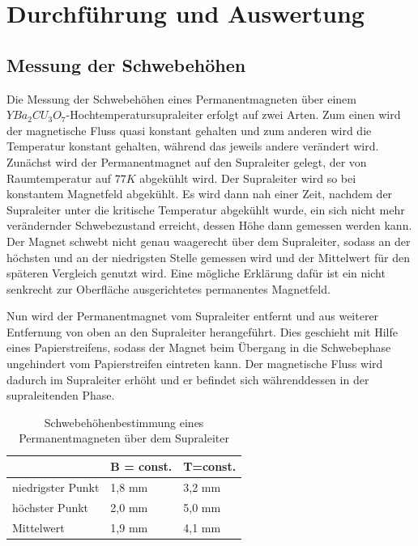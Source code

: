 \section{Durchführung und Auswertung}

\subsection{Messung der Schwebehöhen}

Die Messung der Schwebehöhen eines Permanentmagneten über einem $YBa_2CU_3O_7$-Hochtemperatursupraleiter erfolgt auf zwei Arten. Zum einen wird der magnetische Fluss quasi konstant gehalten und zum anderen wird die Temperatur konstant gehalten, während das jeweils andere verändert wird.
Zunächst wird der Permanentmagnet auf den Supraleiter gelegt, der von Raumtemperatur auf $77K$ abgekühlt wird. Der Supraleiter wird so bei konstantem Magnetfeld abgekühlt. Es wird dann nah einer Zeit, nachdem der Supraleiter unter die kritische Temperatur abgekühlt wurde, ein sich nicht mehr verändernder Schwebezustand erreicht, dessen Höhe dann gemessen werden kann. Der Magnet schwebt nicht genau waagerecht über dem Supraleiter, sodass an der höchsten und an der niedrigsten Stelle gemessen wird und der Mittelwert für den späteren Vergleich genutzt wird. Eine mögliche Erklärung dafür ist ein nicht senkrecht zur Oberfläche ausgerichtetes permanentes Magnetfeld.

Nun wird der Permanentmagnet vom Supraleiter entfernt und aus weiterer Entfernung von oben an den Supraleiter herangeführt. Dies geschieht mit Hilfe eines Papierstreifens, sodass der Magnet beim Übergang in die Schwebephase ungehindert vom Papierstreifen eintreten kann. Der magnetische Fluss wird dadurch im Supraleiter erhöht und er befindet sich währenddessen in der supraleitenden Phase.

\begin{table}[h]
\caption{Schwebehöhenbestimmung eines Permanentmagneten über dem Supraleiter}
\begin{tabular}[h]{|l|l|l|}
\hline
 & B = const. &  T=const. \\
\hline
niedrigster Punkt & 1,8 mm & 3,2 mm \\
höchster Punkt & 2,0 mm & 5,0 mm \\
Mittelwert & 1,9 mm & 4,1 mm \\ \hline

\end{tabular}
\label{schwebe}
\end{table}

